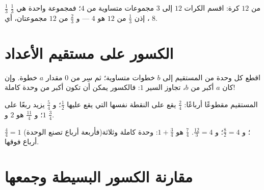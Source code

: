 \begin{example}\label{ex:g4:fractions:collection}
$\frac13$ من $12$ كرة: اقسم الكرات $12$ إلى $3$ مجموعات
متساوية من $4$؛ فمجموعة واحدة هي $\frac13$، إذن $\frac13$ من $12$ هو $4$
--- و $\frac23$ من $12$ مجموعتان، أي $8$.
\end{example}

\section{الكسور على مستقيم الأعداد}

\begin{method}\label{met:g4:fractions:line}
اقطع كل وحدة من المستقيم إلى $b$ خطوات متساوية؛ ثم سِر من $0$
مقدار $a$ خطوة. وإن كان $a$ أكبر من $b$، تجاوز السير $1$:
فالكسور يمكن أن تكون أكبر من وحدة كاملة!
\end{method}

\begin{omfigure}

{\small المستقيم مقطوعًا أرباعًا: $\frac24$ يقع على النقطة
نفسها التي يقع عليها $\frac12$؛ و $\frac54$ يزيد ربعًا على $1$؛
و $\frac{11}{4}$ هو $2$ و $\frac34$.}
\end{omfigure}

\begin{example}\label{ex:g4:fractions:whole}
$\frac44 = 1$ (فأربعة أرباع تصنع الوحدة)؛ و $\frac82 = 4$؛
و $\frac{12}{3} = 4$.  $\frac74$ هو $1 + \frac34$: وحدة كاملة
وثلاثة أرباع فوقها.
\end{example}

\section{مقارنة الكسور البسيطة وجمعها}

